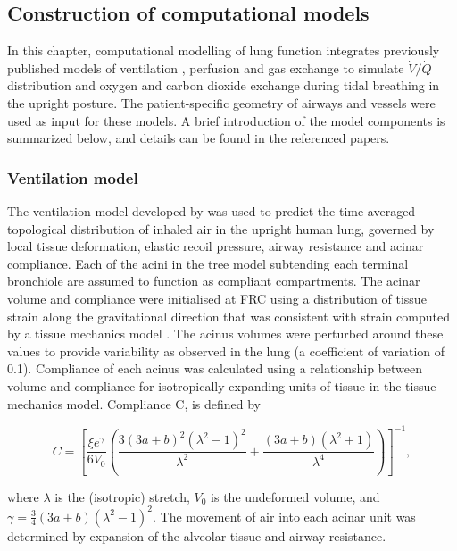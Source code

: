 \subsection{Construction of computational models} \label{ComputationalModelConstruction}
In this chapter, computational modelling of lung function integrates previously published models of ventilation \citep{swan2012computational}, perfusion \citep{clark2010contribution, clark2011interdependent} and gas exchange \citep{clark2014lack} to simulate $\dot{V}/\dot{Q}$ distribution and oxygen and carbon dioxide exchange during tidal breathing in the upright posture. The patient-specific geometry of airways and vessels were used as input for these models. A brief introduction of the model components is summarized below, and details can be found in the referenced papers.

\subsubsection{Ventilation model}
The ventilation model developed by \cite{swan2012computational} was used to predict the time-averaged topological distribution of inhaled air in the upright human lung, governed by local tissue deformation, elastic recoil pressure, airway resistance and acinar compliance. Each of the acini in the tree model subtending each terminal bronchiole are assumed to function as compliant compartments. The acinar volume and compliance were initialised at FRC using a distribution of tissue strain along the gravitational direction that was consistent with strain computed by a tissue mechanics model \citep{tawhai2009supine}. The acinus volumes were perturbed around these values to provide variability as observed in the lung (a coefficient of variation of 0.1). Compliance of each acinus was calculated using a relationship between volume and compliance for isotropically expanding units of tissue in the \cite{tawhai2009supine} tissue mechanics model. Compliance C, is defined by

\begin{equation}
 \label{eq:TissueCompliance}
 C = [\frac{\xi e^{\gamma}}{6V_0}(\frac{3(3a+b)^2(\lambda^2-1)^2}{\lambda^2} + \frac{(3a+b)(\lambda^2 + 1)}{\lambda^4})]^{-1},
\end{equation}

\noindent where $\lambda$ is the (isotropic) stretch, $V_0$ is the undeformed volume, and $\gamma = \frac{3}{4}(3a+b)(\lambda^2-1)^2$. The movement of air into each acinar unit was determined by expansion of the alveolar tissue and airway resistance.

